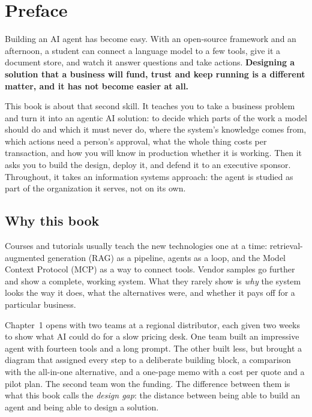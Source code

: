 
\chapter*{Preface}

Building an AI agent has become easy. With an open-source framework and an afternoon, a student can connect a language model to a few tools, give it a document store, and watch it answer questions and take actions. \textbf{Designing a solution that a business will fund, trust and keep running is a different matter, and it has not become easier at all.}

This book is about that second skill. It teaches you to take a business problem and turn it into an agentic AI solution: to decide which parts of the work a model should do and which it must never do, where the system's knowledge comes from, which actions need a person's approval, what the whole thing costs per transaction, and how you will know in production whether it is working. Then it asks you to build the design, deploy it, and defend it to an executive sponsor. Throughout, it takes an information systems approach: the agent is studied as part of the organization it serves, not on its own.

\section*{Why this book}

Courses and tutorials usually teach the new technologies one at a time: retrieval-augmented generation (RAG) as a pipeline, agents as a loop, and the Model Context Protocol (MCP) as a way to connect tools. Vendor samples go further and show a complete, working system. What they rarely show is \emph{why} the system looks the way it does, what the alternatives were, and whether it pays off for a particular business.

Chapter~1 opens with two teams at a regional distributor, each given two weeks to show what AI could do for a slow pricing desk. One team built an impressive agent with fourteen tools and a long prompt. The other built less, but brought a diagram that assigned every step to a deliberate building block, a comparison with the all-in-one alternative, and a one-page memo with a cost per quote and a pilot plan. The second team won the funding. The difference between them is what this book calls the \emph{design gap}: the distance between being able to build an agent and being able to design a solution.


